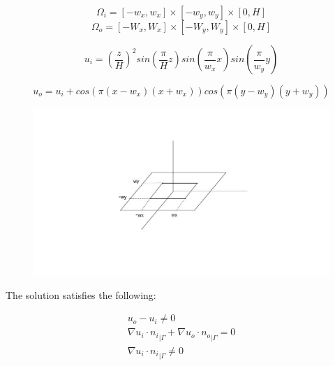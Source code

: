 \documentclass{article}
\begin{document}
\begin{equation*}
\Omega _i =[-w_x, w_x] \times [-w_y, w_y] \times [0,H]
\end{equation*}
\begin{equation*}
\Omega _o=[-W_x, W_x] \times [-W_y, W_y] \times [0,H]
\end{equation*}

\begin{equation*}
u_i=\left( \frac{z}{H} \right)^2 sin(\frac{\pi}{H}z) sin(\frac{\pi}{w_x}x) sin(\frac{\pi}{w_y}y)
\end{equation*}

\begin{equation*}
u_o= u_i + cos (\pi (x-w_x)(x+w_x)) cos(\pi (y- w_y)(y+w_y))
\end{equation*}
\begin{figure}
\center
\includegraphics[scale=0.5]{bm.jpg}
\end{figure}
The solution satisfies the following:

\begin{eqnarray*}
u_o -u_i \neq 0\\
{\nabla u_i \cdot n_i }_{|\Gamma} + {\nabla u_o \cdot n_o} _{|\Gamma} =0\\
{\nabla u_i \cdot n_i} _{|\Gamma} \neq 0 
\end{eqnarray*}
\end{document}
